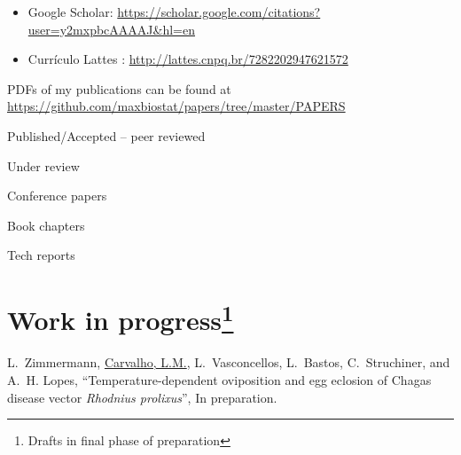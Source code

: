 \documentclass[10pt]{article}
\begin{document}
\begin{itemize}
 \item[] Google Scholar: \url{https://scholar.google.com/citations?user=y2mxpbcAAAAJ&hl=en}\\
 \item[] Curr\'iculo Lattes : \url{ http://lattes.cnpq.br/7282202947621572} 
\end{itemize}

\newpage
PDFs of my publications can be found at \url{https://github.com/maxbiostat/papers/tree/master/PAPERS}
\nocite{*}
\begin{category}{Published/Accepted -- peer reviewed}
\end{category}

\begin{category}{Under review}
\end{category}

\begin{category}{Conference papers}
\end{category}

\begin{category}{Book chapters}
\end{category}

\begin{category}{Tech reports}
\end{category}




\section*{Work in progress\footnote{Drafts in final phase of preparation}}

L.~Zimmermann, \underline{Carvalho, L.M.}, L.~Vasconcellos, L.~Bastos, C.~Struchiner, and A.~H. Lopes, ``{T}emperature-dependent oviposition and egg eclosion of {C}hagas disease vector \textit{{R}hodnius prolixus}'', In preparation.
\end{document}
